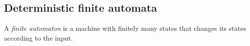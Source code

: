 

\setcounter{section}{1}
\setcounter{subsection}{2}
\setcounter{dfn}{0}

\subsection{Deterministic finite automata}
A \emph{finite automaton} is a machine with finitely many states that changes its states according to the input.


